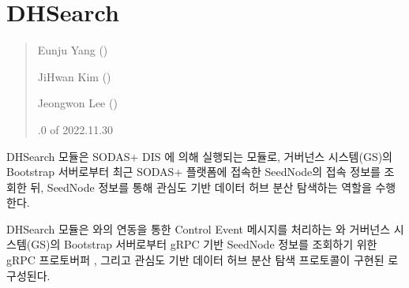 \documentclass[a4paper,10pt,english]{sphinxmanual}
\begin{document}
\sphinxstepscope


\chapter{DHSearch}
\label{\detokenize{DHSearch:dhsearch}}\label{\detokenize{DHSearch:dhsearchmodule}}\label{\detokenize{DHSearch::doc}}\begin{quote}\begin{description}
\begin{DUlineblock}{0em}
\item[] Eunju Yang ()
\item[] JiHwan Kim ()
\item[] Jeongwon Lee ()
\end{DUlineblock}

.0 of 2022.11.30

\end{description}\end{quote}

\sphinxAtStartPar
DHSearch 모듈은 SODAS+ DIS {\hyperref[\detokenize{_DHDaemon:dhdaemon}]{}} 에 의해 실행되는 모듈로, 거버넌스 시스템(GS)의 Bootstrap 서버로부터 최근 SODAS+ 플랫폼에 접속한 SeedNode의 접속 정보를 조회한 뒤, SeedNode 정보를 통해 관심도 기반 데이터 허브 분산 탐색하는 역할을 수행한다.

\sphinxAtStartPar
DHSearch 모듈은 {\hyperref[\detokenize{_DHDaemon:dhdaemon}]{}} 와의 연동을 통한 Control Event 메시지를 처리하는 {\hyperref[\detokenize{_DHSearch:dhsearch}]{}} 와 거버넌스 시스템(GS)의 Bootstrap 서버로부터 gRPC 기반 SeedNode 정보를 조회하기 위한 gRPC 프로토버퍼 {\hyperref[\detokenize{_BootstrapProto:bootstrapproto}]{}},
그리고 관심도 기반 데이터 허브 분산 탐색 프로토콜이 구현된 {\hyperref[\detokenize{_kademlia:kademlia}]{}} 로 구성된다.

\begin{DUlineblock}{0em}
\item[] 
\end{DUlineblock}

\sphinxstepscope
\end{document}
